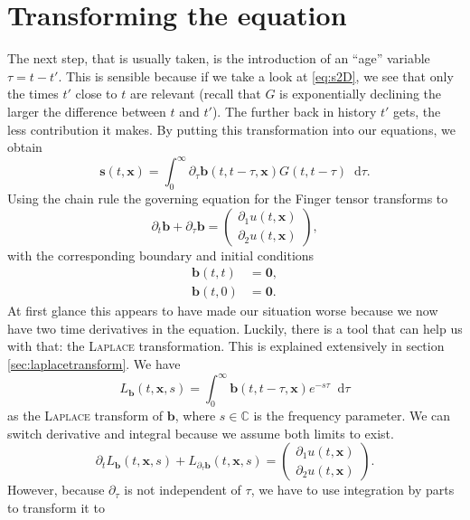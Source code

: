 \documentclass[12pt,a4paper,twoside, open=right]{scrreprt}
\theoremstyle{definition}
\theoremstyle{plain}
\newcommand{\cc}{\mathbb{C}}
\newcommand{\bfb}{\bm{b}}
\newcommand{\bfs}{\bm{s}}
\newcommand{\bfx}{\bm{x}}
\newcommand{\D}{\mathop{}\!\mathrm{d}}
\begin{document}
\section{Transforming the equation}
The next step, that is usually taken, is the introduction of an \enquote{age} variable $\tau=t-t'$. This is sensible because if we take a look at \eqref{eq:s2D}, we see that only the times $t'$ close to $t$ are relevant (recall that $G$ is exponentially declining the larger the difference between $t$ and $t'$). The further back in history $t'$ gets, the less contribution it makes. By putting this transformation into our equations, we obtain
\begin{equation}
    \bfs(t,\bfx)=\int_0^\infty\partial_\tau\bfb(t,t-\tau,\bfx)G(t,t-\tau)\D\tau.\label{eq:sage}
\end{equation}
Using the chain rule the governing equation for the Finger tensor transforms to  
\begin{equation}
    \partial_t \bfb +\partial_\tau\bfb = \begin{pmatrix}
    \partial_1 u(t,\bfx)\\\partial_2 u(t,\bfx)
    \end{pmatrix},
\end{equation}
with the corresponding boundary and initial conditions
\begin{align}
    \bfb(t,t) &= \bm{0},\\
    \bfb(t,0) &= \bm{0}.
\end{align}
At first glance this appears to have made our situation worse because we now have two time derivatives in the equation. Luckily, there is a tool that can help us with that: the \textsc{Laplace} transformation. This is explained extensively in section \ref{sec:laplacetransform}. We have
\begin{equation}
L_{\bfb}(t,\bfx,s) =\int_0^\infty\bfb(t,t-\tau,\bfx)e^{-s\tau}\D\tau
\end{equation}
as the \textsc{Laplace} transform of $\bfb$, where $s\in\cc$ is the frequency parameter. 
We can switch derivative and integral because we assume both limits to exist.
\begin{equation}
    \partial_tL_{\bfb}(t,\bfx,s) + L_{\partial_\tau\bfb}(t,\bfx,s) = \begin{pmatrix}
    \partial_1 u(t,\bfx)\\\partial_2 u(t,\bfx)
    \end{pmatrix}.
\end{equation}
However, because $\partial_\tau$ is not independent of $\tau$, we have to use integration by parts to transform it to
\end{document}
